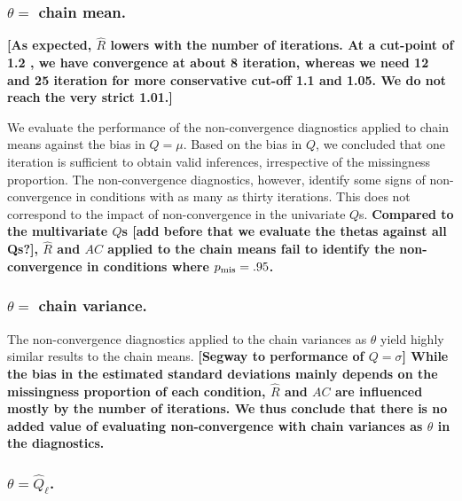 \documentclass[Royal,times,sageh]{sagej}
\begin{document}
\hypertarget{theta-chain-mean.}{%
\subsubsection{\texorpdfstring{\(\theta=\) chain mean.}{\textbackslash theta= chain mean.}}\label{theta-chain-mean.}}

\textbf{{[}As expected, \(\widehat{R}\) lowers with the number of iterations. At a cut-point of 1.2 , we have convergence at about 8 iteration, whereas we need 12 and 25 iteration for more conservative cut-off 1.1 and 1.05. We do not reach the very strict 1.01.{]}}

We evaluate the performance of the non-convergence diagnostics applied to chain means against the bias in \(Q=\mu\). Based on the bias in \(Q\), we concluded that one iteration is sufficient to obtain valid inferences, irrespective of the missingness proportion. The non-convergence diagnostics, however, identify some signs of non-convergence in conditions with as many as thirty iterations. This does not correspond to the impact of non-convergence in the univariate \(Q\)s. \textbf{Compared to the multivariate \(Q\)s {[}add before that we evaluate the thetas against all Qs?{]}, \(\widehat{R}\) and \(AC\) applied to the chain means fail to identify the non-convergence in conditions where \(p_{\rm mis}=.95\).}

\hypertarget{theta-chain-variance.}{%
\subsubsection{\texorpdfstring{\(\theta=\) chain variance.}{\textbackslash theta= chain variance.}}\label{theta-chain-variance.}}

The non-convergence diagnostics applied to the chain variances as \(\theta\) yield highly similar results to the chain means. \textbf{{[}Segway to performance of \(Q=\sigma\){]} While the bias in the estimated standard deviations mainly depends on the missingness proportion of each condition, \(\widehat{R}\) and \(AC\) are influenced mostly by the number of iterations. We thus conclude that there is no added value of evaluating non-convergence with chain variances as \(\theta\) in the diagnostics.}

\hypertarget{thetahatq_ell.}{%
\subsubsection{\texorpdfstring{\(\theta=\hat{Q}_\ell\).}{\textbackslash theta=\textbackslash hat\{Q\}\_\textbackslash ell.}}\label{thetahatq_ell.}}
\end{document}
